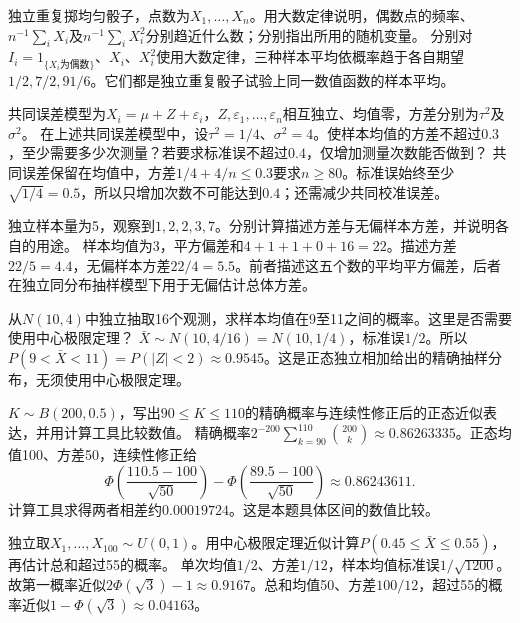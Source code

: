 独立重复掷均匀骰子，点数为\(X_1,\ldots,X_n\)。用大数定律说明，偶数点的频率、\(n^{-1}\sum_iX_i\)及\(n^{-1}\sum_iX_i^2\)分别趋近什么数；分别指出所用的随机变量。
\solutionanswer
分别对\(I_i=1_{\{X_i\text{为偶数}\}}\)、\(X_i\)、\(X_i^2\)使用大数定律，三种样本平均依概率趋于各自期望\(1/2,7/2,91/6\)。它们都是独立重复骰子试验上同一数值函数的样本平均。


共同误差模型为\(X_i=\mu+Z+\varepsilon_i\)，\(Z,\varepsilon_1,\ldots,\varepsilon_n\)相互独立、均值零，方差分别为\(\tau^2\)及\(\sigma^2\)。
在上述共同误差模型中，设\(\tau^2=1/4\)、\(\sigma^2=4\)。使样本均值的方差不超过\(0.3\)，至少需要多少次测量？若要求标准误不超过\(0.4\)，仅增加测量次数能否做到？
\solutionanswer
共同误差保留在均值中，方差\(1/4+4/n\le0.3\)要求\(n\ge80\)。标准误始终至少\(\sqrt{1/4}=0.5\)，所以只增加次数不可能达到\(0.4\)；还需减少共同校准误差。


独立样本量为5，观察到\(1,2,2,3,7\)。分别计算描述方差与无偏样本方差，并说明各自的用途。
\solutionanswer
样本均值为3，平方偏差和\(4+1+1+0+16=22\)。描述方差\(22/5=4.4\)，无偏样本方差\(22/4=5.5\)。前者描述这五个数的平均平方偏差，后者在独立同分布抽样模型下用于无偏估计总体方差。


从\(N(10,4)\)中独立抽取16个观测，求样本均值在9至11之间的概率。这里是否需要使用中心极限定理？
\solutionanswer
\(\bar X\sim N(10,4/16)=N(10,1/4)\)，标准误\(1/2\)。所以\(P(9<\bar X<11)=P(|Z|<2)\approx0.9545\)。这是正态独立相加给出的精确抽样分布，无须使用中心极限定理。


\(K\sim B(200,0.5)\)，写出\(90\le K\le110\)的精确概率与连续性修正后的正态近似表达，并用计算工具比较数值。
\solutionanswer
精确概率\(2^{-200}\sum_{k=90}^{110}\binom{200}k\approx0.86263335\)。正态均值100、方差50，连续性修正给
\[
 \Phi\left(\frac{110.5-100}{\sqrt{50}}\right)-\Phi\left(\frac{89.5-100}{\sqrt{50}}\right)\approx0.86243611.
\]
计算工具求得两者相差约\(0.00019724\)。这是本题具体区间的数值比较。


独立取\(X_1,\ldots,X_{100}\sim U(0,1)\)。用中心极限定理近似计算\(P(0.45\le\bar X\le0.55)\)，再估计总和超过55的概率。
\solutionanswer
单次均值\(1/2\)、方差\(1/12\)，样本均值标准误\(1/\sqrt{1200}\)。故第一概率近似\(2\Phi(\sqrt3)-1\approx0.9167\)。总和均值50、方差\(100/12\)，超过55的概率近似\(1-\Phi(\sqrt3)\approx0.04163\)。


